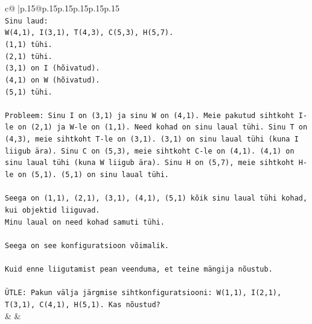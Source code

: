\documentclass{article}
\begin{document}
{\begin{supertabular}{c@{$\;$}|p{.15\linewidth}@{}p{.15\linewidth}p{.15\linewidth}p{.15\linewidth}p{.15\linewidth}p{.15\linewidth}}
{{{\\ 
\texttt{Sinu laud:} \\
\texttt{W(4,1), I(3,1), T(4,3), C(5,3), H(5,7).} \\
\texttt{(1,1) tühi.} \\
\texttt{(2,1) tühi.} \\
\texttt{(3,1) on I (hõivatud).} \\
\texttt{(4,1) on W (hõivatud).} \\
\texttt{(5,1) tühi.} \\
\\ 
\texttt{Probleem: Sinu I on (3,1) ja sinu W on (4,1). Meie pakutud sihtkoht I{-}le on (2,1) ja W{-}le on (1,1). Need kohad on sinu laual tühi. Sinu T on (4,3), meie sihtkoht T{-}le on (3,1). (3,1) on sinu laual tühi (kuna I liigub ära). Sinu C on (5,3), meie sihtkoht C{-}le on (4,1). (4,1) on sinu laual tühi (kuna W liigub ära). Sinu H on (5,7), meie sihtkoht H{-}le on (5,1). (5,1) on sinu laual tühi.} \\
\\ 
\texttt{Seega on (1,1), (2,1), (3,1), (4,1), (5,1) kõik sinu laual tühi kohad, kui objektid liiguvad.} \\
\texttt{Minu laual on need kohad samuti tühi.} \\
\\ 
\texttt{Seega on see konfiguratsioon võimalik.} \\
\\ 
\texttt{Kuid enne liigutamist pean veenduma, et teine mängija nõustub.} \\
\\ 
\texttt{ÜTLE: Pakun välja järgmise sihtkonfiguratsiooni: W(1,1), I(2,1), T(3,1), C(4,1), H(5,1). Kas nõustud?} \\
            }
        }
    }
    & & \\ \\


\end{supertabular}}
\end{document}
